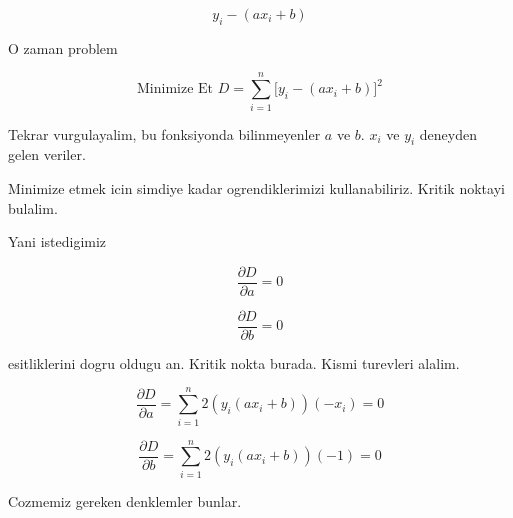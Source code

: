\documentclass[12pt,fleqn]{article}
\begin{document}
\[ y_i - (ax_i + b) \]

O zaman problem

\[ \textrm{Minimize Et } D = \sum_{i=1}^n \bigg[ y_i - (ax_i+b) \bigg]^2 \]

Tekrar vurgulayalim, bu fonksiyonda bilinmeyenler $a$ ve $b$. $x_i$ ve
$y_i$ deneyden gelen veriler. 

Minimize etmek icin simdiye kadar ogrendiklerimizi kullanabiliriz. Kritik
noktayi bulalim. 

Yani istedigimiz 

\[ \frac{\partial D}{\partial a} =0 \]

\[ \frac{\partial D}{\partial b} =0 \]

esitliklerini dogru oldugu an. Kritik nokta burada. Kismi turevleri alalim.

\[ \frac{\partial D}{\partial a}  =
\sum_{i=1}^n 2 (y_i (ax_i+b)) (-x_i) 
= 0
 \]

\[ \frac{\partial D}{\partial b} = 
\sum_{i=1}^n 2 (y_i (ax_i+b)) (-1) 
=0 \]

Cozmemiz gereken denklemler bunlar. 
\end{document}
